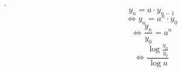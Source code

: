 \documentclass[11pt,a4paper]{article}
\begin{document}
.\\
$$y_n=a\cdot y_{n-1}$$
$$\Leftrightarrow y_n=a^n\cdot y_0$$
$$\Leftrightarrow\frac{y_n}{y_0}=a^n$$
$$\Leftrightarrow\frac{\log\frac{y_n}{y_0}}{\log a}$$
\end{document}
